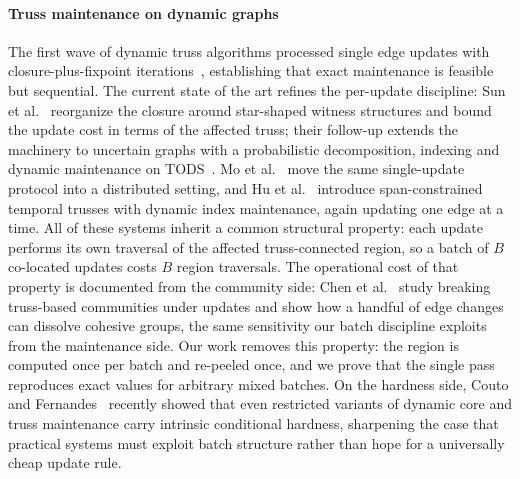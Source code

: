 \label{sec:related}

\paragraph{Truss maintenance on dynamic graphs}
The first wave of dynamic truss algorithms processed single edge updates with closure-plus-fixpoint iterations~\cite{zhou2014efficient}, establishing that exact maintenance is feasible but sequential.
The current state of the art refines the per-update discipline: Sun et al.~\cite{sun2023efficient} reorganize the closure around star-shaped witness structures and bound the update cost in terms of the affected truss; their follow-up extends the machinery to uncertain graphs with a probabilistic decomposition, indexing and dynamic maintenance on TODS~\cite{sun2025probabilistic}.
Mo et al.~\cite{mo2023distributed} move the same single-update protocol into a distributed setting, and Hu et al.~\cite{hu2026querying} introduce span-constrained temporal trusses with dynamic index maintenance, again updating one edge at a time.
All of these systems inherit a common structural property: each update performs its own traversal of the affected truss-connected region, so a batch of $B$ co-located updates costs $B$ region traversals.
The operational cost of that property is documented from the community side: Chen et al.~\cite{chen2021breaking} study breaking truss-based communities under updates and show how a handful of edge changes can dissolve cohesive groups, the same sensitivity our batch discipline exploits from the maintenance side.
Our work removes this property: the region is computed once per batch and re-peeled once, and we prove that the single pass reproduces exact values for arbitrary mixed batches.
On the hardness side, Couto and Fernandes~\cite{couto2025hardness} recently showed that even restricted variants of dynamic core and truss maintenance carry intrinsic conditional hardness, sharpening the case that practical systems must exploit batch structure rather than hope for a universally cheap update rule.

